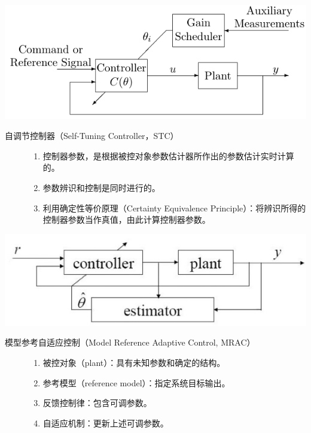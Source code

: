   \begin{center}
  \includegraphics[scale=0.5]{figure/adaptive/gain_scheduling.png}
\end{center}
  \begin{description}
    \item[自调节控制器（Self-Tuning Controller，STC）]
    \begin{enumerate}
      \item 控制器参数，是根据被控对象参数估计器所作出的参数估计实时计算的。
      
      \item 参数辨识和控制是同时进行的。
      
      \item 利用确定性等价原理（Certainty Equivalence Principle）：将辨识所得的控制器参数当作真值，由此计算控制器参数。
    \end{enumerate}
  \end{description}
  \begin{center}
  \includegraphics[scale=0.5]{figure/adaptive/stc.png}
\end{center}
  \begin{description}
    \item[模型参考自适应控制（Model Reference Adaptive Control, MRAC）]
    \begin{enumerate}
      \item 被控对象（plant）：具有未知参数和确定的结构。
      
      \item 参考模型（reference model）：指定系统目标输出。
      
      \item 反馈控制律：包含可调参数。
      
      \item 自适应机制：更新上述可调参数。
    \end{enumerate}
  \end{description}
